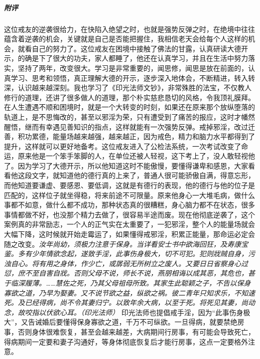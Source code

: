 \begin{case}
    \subparagraph{附评} 这位戒友的逆袭很给力，在快陷入绝望之时，也就是强势反弹之时，在绝境中往往蕴含着逆袭的机会，关键就是自己是否能把握住，我相信老天会给每个人这样的机会，就看自己的努力了。这位戒友在困境中接触了佛法的甘露，认真研读大德开示，的确是下了很大的功夫，家人都睡了，他还在认真学习，并且在生活中努力落实，坚持了两年，改变很大。学习是非常重要的，闻思修，闻思是放在前面的，认真学习、思考和领悟，真正理解大德的开示，逐步深入地体会，不断精进，转入转深，认识越来越深刻。我也学习了《印光法师文钞》，非常殊胜的法宝，不仅教人修行的道理，还讲了很多做人的道理，那个朴实慈悲恳切的风格，令我顶礼膜拜。在人生遭遇不顺和困境时，就是一个大转变的时刻，如果还在原来那个放纵堕落的轨道上，是不思悔改的，甚至以邪淫为荣，只有遭受到了痛苦的报应，这时才幡然醒悟，继而有幸遇见善知识的指点，这样就能有一次强势反弹。戒掉邪淫，改过迁善，积功累德，能量场越来越强，越来越正，因为戒色，精力和脑力水平都得到了提升，这样就可以更好地备考。这位戒友进入了公检法系统，一次考试改变了命运，原来他是一个笨手笨脚的人，在单位还被人轻视，这下考上了，没人敢轻视他了。因为学习了大德开示，所以他知道这时不能傲慢，要懂得谦卑和感恩，大家看看他这段文字，就知道他的德行真的上来了，普通人很可能骄傲自满，得意忘形，而他知道要谦虚、要感恩、要低调，这就是有德行的表现，他的德行与他的位子是匹配的，这样位子就坐得稳，将来前途不可限量。原来他身心一大堆毛病，做什么事都不如意，做什么都不成功，那种状态真的很糟糕，身心脑力都不在状态，很多事情都做不好，也没那个精力去做了，很容易半途而废。现在他彻底逆袭了，这个案例真的非常励志，一个人的正气实在太重要了，一犯邪淫，整个人的能量场就会大幅下降，这时候就开始走霉运了，如果懂得戒邪淫，积累正能量，那命运必定会随之改变。\textit{汝年尚幼，须极力注意于保身。当详看安士书中欲海回狂，及寿康宝鉴。多有少年情欲念起，遂致手淫，此事伤身极大，切不可犯。犯则戕贼自身，污浊自心。将有用之身体，作少亡，或孱弱无所树立之废人。又要日日省察身心过愆，庶不至自害自戕。否则父母不说，师长不说，燕朋相诲以成其恶，其危也，甚于临深履薄。……慧佐之死，乃其父母祖母所致。其家生此聪颖之子，不告以保身寡欲之道，乃早为娶妻。又不说节欲之益，纵欲之祸。彼二青年只知求乐，不知速死。及已经得病，尚不令其妻归宁。以致年余大病，以至于死。将死见其妻，尚动念，故咬指以伏欲心耳。（印光法师）} 印光法师也提倡戒手淫，因为“此事伤身极大”，又告诫婚后要懂得保身寡欲之道，千万不可纵欲。一旦得病，就要禁绝房事，否则身体很难恢复，甚至会越来越差，大病期间行房事，有可能会导致死亡，得病期间一定要和妻子沟通好，等身体彻底恢复后才能行房事，这点一定要格外注意。
\end{case}


